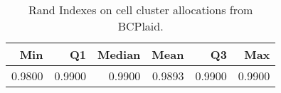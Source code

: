 \begin{table}[ht]
\caption{Rand Indexes on cell cluster allocations from BCPlaid.}
\label{tab:pbmc_bcplaid_cellclust}
\centering
\begin{tabular}{rrrrrr}
  \toprule
Min & Q1 & Median & Mean & Q3 & Max \\ 
  \midrule
0.9800 & 0.9900 & 0.9900 & 0.9893 & 0.9900 & 0.9900 \\ 
   \bottomrule
\end{tabular}
\end{table}
